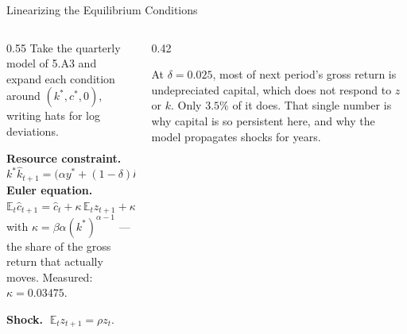 \begin{frame}{Linearizing the Equilibrium Conditions}
\begin{columns}[T]
\begin{column}{0.55\textwidth}
\small
Take the quarterly model of 5.A3 and expand each condition around $(k^{*},c^{*},0)$, writing hats for log deviations.
\medskip

\textbf{Resource constraint.}
\[
  k^{*}\hat{k}_{t+1}
  = \big(\alpha y^{*}+(1-\delta)k^{*}\big)\hat{k}_{t} + y^{*}z_t - c^{*}\hat{c}_t
\]
\textbf{Euler equation.}
\[
  \mathbb{E}_t\hat{c}_{t+1}
  = \hat{c}_t + \kappa\,\mathbb{E}_t z_{t+1} + \kappa(\alpha-1)\hat{k}_{t+1}
\]
with $\kappa=\beta\alpha (k^{*})^{\alpha-1}$ --- the share of the gross return that actually moves. Measured: $\kappa=0.03475$.
\medskip

\textbf{Shock.} $\;\mathbb{E}_t z_{t+1}=\rho z_t$.
\end{column}
\begin{column}{0.42\textwidth}
\begin{conceptbox}[title=\textbf{Why $\kappa$ is small}]\small
At $\delta=0.025$, most of next period's gross return is undepreciated capital, which does not respond to $z$ or $k$. Only $3.5\%$ of it does.
\medskip
That single number is why capital is so persistent here, and why the model propagates shocks for years.
\end{conceptbox}
\end{column}
\end{columns}
\vspace{1mm}
\end{frame}

